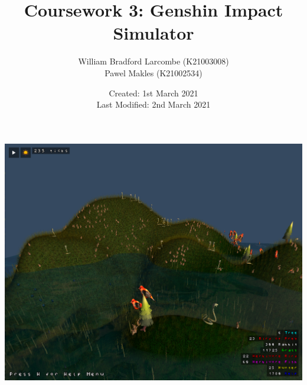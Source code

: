 \documentclass{article}
\title{\Huge Coursework 3: Genshin Impact Simulator}
\author{William Bradford Larcombe \small (K21003008) \\ Pawel Makles \small (K21002534)}
\date{\small Created: 1st March 2021 \\ Last Modified: 2nd March 2021}
\begin{document}
    \maketitle
    \vfill
    {\centering \includegraphics[width=\textwidth]{../screenshot.png}}
    
    \newpage
\end{document}
